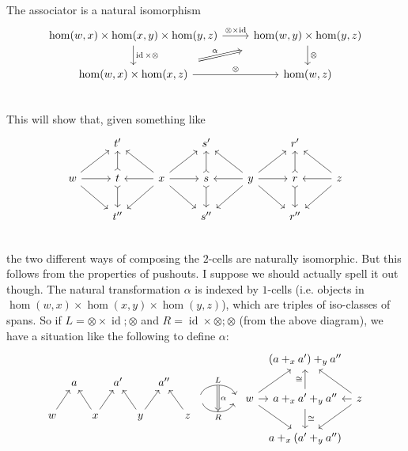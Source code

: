 \documentclass[12pt]{article}
\renewcommand{\(}{\left(}
\renewcommand{\)}{\right)}
\renewcommand{\{}{\left\lbrace}
\renewcommand{\}}{\right\rbrace}
\DeclareMathOperator{\id}{id}
\theoremstyle{remark}
\theoremstyle{definition}
\begin{document}
The associator is a natural isomorphism
\[
	\begin{tikzcd}
		{\hom (w,x) \times \hom (x,y) \times \hom (y,z) } 
			\ar[d,"\id \times \otimes"] 
			\ar[r,"\otimes \times \id"] &
		{\hom (w,y) \times \hom (y,z) } 
			\ar[d, "\otimes"] \\
		{\hom (w,x) \times \hom (x,z)} 
			\ar[r,"\otimes"] 
			\ar[ru, shorten <= 2em, shorten >= 2em, Rightarrow, "\alpha"]&
		{\hom (w,z)} \\
	\end{tikzcd}
\]
This will show that, given something like
\[	
	\begin{tikzcd}
		{} &
		{t'} & 
		{} &
		{s'} &
		{} &
		{r'} &
		{} \\
		{w} 
			\ar[ru]
			\ar[r]
			\ar[rd] &
		{t}
			\ar[d, rightarrowtail]
			\ar[u, rightarrowtail] & 
		{x} 
			\ar[lu]
			\ar[l]
			\ar[ld]
			\ar[ru]
			\ar[r]
			\ar[rd] &
		{s} 
			\ar[d, rightarrowtail]
			\ar[u, rightarrowtail] &
		{y} 
			\ar[lu]
			\ar[l]
			\ar[ld] 
			\ar[ru]
			\ar[r]
			\ar[rd] &
		{r} 
			\ar[u, rightarrowtail]
			\ar[d, rightarrowtail] &
		{z} 
			\ar[lu]
			\ar[l]
			\ar[ld] \\
		{} &
		{t''} & 
		{} &
		{s''} &
		{} &
		{r''} &
		{} \\
	\end{tikzcd}
\]
the two different ways of composing the $2$-cells are naturally isomorphic.  But this follows from the properties of pushouts.  I suppose we should actually spell it out though.  The natural transformation $\alpha$ is indexed by $1$-cells (i.e. objects in $\hom (w,x) \times \hom (x,y) \times \hom (y,z)$), which are triples of iso-classes of spans. So if $L = \otimes \times \id ; \otimes$ and $R = \id \times \otimes ; \otimes$ (from the above diagram), we have a situation like the following to define $\alpha$: 
\[
	\begin{tikzcd}[column sep=.5em]
	 {} &
	 {a} &
	 {} &
	 {a'} &
	 {} &
	 {a''} &
	 {} \\
	 {w} 
		 \ar[ru]&
	 {} &
	 {x} 
		 \ar[lu]
		 \ar[ru] &
	 {} &
	 {y} 
		 \ar[lu]
		 \ar[ru] &
	 {} &
	 {z}
		 \ar[lu] 
	\end{tikzcd}
	\begin{tikzcd}
		{} 
			\ar[r,bend left=70, "L"{name=L}]
			\ar[r,bend right=70,swap, "R"{name=R}] &
		{}
			\ar[Rightarrow,from=L,to=R, "\alpha"]
	\end{tikzcd}
	\begin{tikzcd}[column sep=.5em]
		{} &
		{(a +_x a') +_y a''} &
		{} \\
		{w} 
			\ar[ru]
			\ar[r]
			\ar[rd] &
		{a +_x a' +_y a''} 
			\ar[u,"\cong"]
			\ar[d, "\cong"] &
		{z} 
			\ar[lu]
			\ar[l]
			\ar[ld] \\
		{} &
		{a +_x (a' +_y a'')} &
		{} 
	\end{tikzcd}
\]
\end{document}
